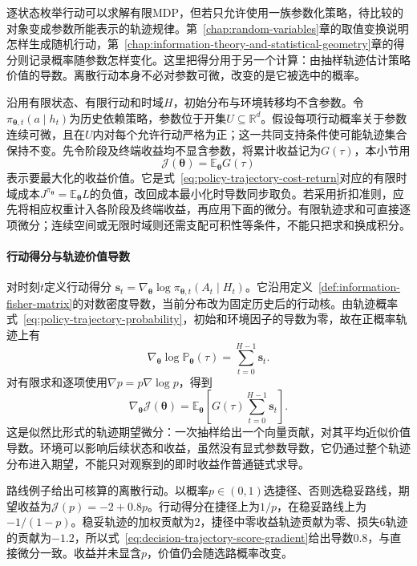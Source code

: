 逐状态枚举行动可以求解有限MDP，但若只允许使用一族参数化策略，待比较的对象变成参数所能表示的轨迹规律。第~\ref{chap:random-variables}章的取值变换说明怎样生成随机行动，第~\ref{chap:information-theory-and-statistical-geometry}章的得分则记录概率随参数怎样变化。这里把得分用于另一个计算：由抽样轨迹估计策略价值的导数。离散行动本身不必对参数可微，改变的是它被选中的概率。

沿用有限状态、有限行动和时域\(H\)，初始分布与环境转移均不含参数。令\(\pi_{\bm\theta,t}(a\mid h_t)\)为历史依赖策略，参数位于开集\(U\subseteq\mathbb R^d\)。假设每项行动概率关于参数连续可微，且在\(U\)内对每个允许行动严格为正；这一共同支持条件使可能轨迹集合保持不变。先令阶段及终端收益均不显含参数，将累计收益记为\(G(\tau)\)，本小节用
\[
 \mathcal J(\bm\theta)=\mathbb E_{\bm\theta}G(\tau)
\]
表示要最大化的收益价值。它是式~\eqref{eq:policy-trajectory-cost-return}对应的有限时域成本\(J^{\pi_{\bm\theta}}=\mathbb E_{\bm\theta}L\)的负值，改回成本最小化时导数同步取负。若采用折扣准则，应先将相应权重计入各阶段及终端收益，再应用下面的微分。有限轨迹求和可直接逐项微分；连续空间或无限时域则还需支配可积性等条件，不能只把求和换成积分。

\paragraph{行动得分与轨迹价值导数}
对时刻\(t\)定义行动得分
\(\bm s_t=\nabla_{\bm\theta}\log\pi_{\bm\theta,t}(A_t\mid H_t)\)。它沿用定义~\ref{def:information-fisher-matrix}的对数密度导数，当前分布改为固定历史后的行动核。由轨迹概率式~\eqref{eq:policy-trajectory-probability}，初始和环境因子的导数为零，故在正概率轨迹上有
\[
 \nabla_{\bm\theta}\log\mathbb P_{\bm\theta}(\tau)
 =\sum_{t=0}^{H-1}\bm s_t.
\]
对有限求和逐项使用\(\nabla p=p\nabla\log p\)，得到
\begin{equation}
 \nabla_{\bm\theta}\mathcal J(\bm\theta)
 =\mathbb E_{\bm\theta}
 \left[G(\tau)\sum_{t=0}^{H-1}\bm s_t\right].
 \label{eq:decision-trajectory-score-gradient}
\end{equation}
这是似然比形式的轨迹期望微分：一次抽样给出一个向量贡献，对其平均近似价值导数。环境可以影响后续状态和收益，虽然没有显式参数导数，它仍通过整个轨迹分布进入期望，不能只对观察到的即时收益作普通链式求导。

路线例子给出可核算的离散行动。以概率\(p\in(0,1)\)选捷径、否则选稳妥路线，期望收益为\(\mathcal J(p)=-2+0.8p\)。行动得分在捷径上为\(1/p\)，在稳妥路线上为\(-1/(1-p)\)。稳妥轨迹的加权贡献为\(2\)，捷径中零收益轨迹贡献为零、损失\(6\)轨迹的贡献为\(-1.2\)，所以式~\eqref{eq:decision-trajectory-score-gradient}给出导数\(0.8\)，与直接微分一致。收益并未显含\(p\)，价值仍会随选路概率改变。

